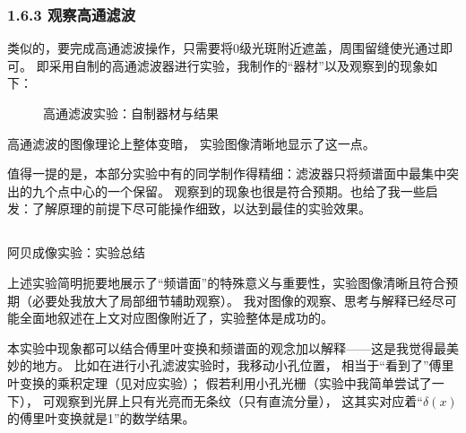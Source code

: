 \documentclass[11pt]{article}
\begin{document}
\newpage
\subsubsection*{1.6.3 观察高通滤波}

类似的，要完成高通滤波操作，只需要将0级光斑附近遮盖，周围留缝使光通过即可。
即采用自制的高通滤波器进行实验，我制作的“器材”以及观察到的现象如下：

\begin{figure}[H]
    \centering
    \hspace{0.5cm}
    \caption{高通滤波实验：自制器材与结果}
\end{figure}

高通滤波的图像理论上整体变暗，
实验图像清晰地显示了这一点。

值得一提的是，本部分实验中有的同学制作得精细：滤波器只将频谱面中最集中突出的九个点中心的一个保留。
观察到的现象也很是符合预期。也给了我一些启发：了解原理的前提下尽可能操作细致，以达到最佳的实验效果。


\subsection[阿贝成像实验：实验总结 ]{}

\begin{center}
    \begin{tcolorbox}[colback=gray!10,%
                      colframe=black,%
                      width=5cm,%
                      arc=1mm, auto outer arc,
                      boxrule=0.5pt,
                     ]
                     \begin{center}
                    阿贝成像实验：实验总结      
                     \end{center}
    \end{tcolorbox}
\end{center}

上述实验简明扼要地展示了“频谱面”的特殊意义与重要性，实验图像清晰且符合预期（必要处我放大了局部细节辅助观察）。
我对图像的观察、思考与解释已经尽可能全面地叙述在上文对应图像附近了，实验整体是成功的。

本实验中现象都可以结合傅里叶变换和频谱面的观念加以解释——这是我觉得最美妙的地方。
比如在进行小孔滤波实验时，我移动小孔位置，
相当于“看到了”傅里叶变换的乘积定理（见对应实验）；
假若利用小孔光栅（实验中我简单尝试了一下），
可观察到光屏上只有光亮而无条纹（只有直流分量），
这其实对应着“$\delta(x)$的傅里叶变换就是1”的数学结果。
\end{document}
